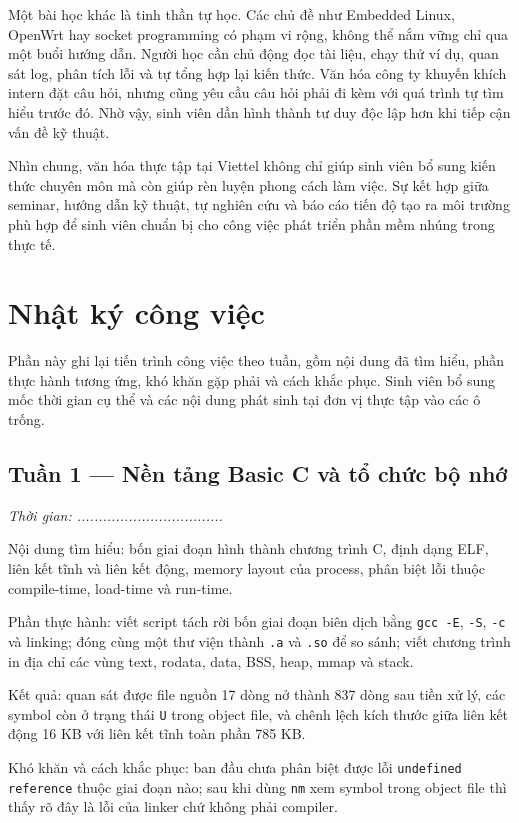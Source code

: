 \documentclass[11pt]{article}
\newcommand{\code}[1]{\texttt{#1}}
\begin{document}
Một bài học khác là tinh thần tự học. Các chủ đề như Embedded Linux, OpenWrt hay socket programming có phạm vi rộng, không thể nắm vững chỉ qua một buổi hướng dẫn. Người học cần chủ động đọc tài liệu, chạy thử ví dụ, quan sát log, phân tích lỗi và tự tổng hợp lại kiến thức. Văn hóa công ty khuyến khích intern đặt câu hỏi, nhưng cũng yêu cầu câu hỏi phải đi kèm với quá trình tự tìm hiểu trước đó. Nhờ vậy, sinh viên dần hình thành tư duy độc lập hơn khi tiếp cận vấn đề kỹ thuật.

Nhìn chung, văn hóa thực tập tại Viettel không chỉ giúp sinh viên bổ sung kiến thức chuyên môn mà còn giúp rèn luyện phong cách làm việc. Sự kết hợp giữa seminar, hướng dẫn kỹ thuật, tự nghiên cứu và báo cáo tiến độ tạo ra môi trường phù hợp để sinh viên chuẩn bị cho công việc phát triển phần mềm nhúng trong thực tế.

\section{Nhật ký công việc}

Phần này ghi lại tiến trình công việc theo tuần, gồm nội dung đã tìm hiểu, phần thực hành tương ứng, khó khăn gặp phải và cách khắc phục. Sinh viên bổ sung mốc thời gian cụ thể và các nội dung phát sinh tại đơn vị thực tập vào các ô trống.

\subsection*{Tuần 1 --- Nền tảng Basic C và tổ chức bộ nhớ}

\textit{Thời gian: ..................................}

Nội dung tìm hiểu: bốn giai đoạn hình thành chương trình C, định dạng ELF, liên kết tĩnh và liên kết động, memory layout của process, phân biệt lỗi thuộc compile-time, load-time và run-time.

Phần thực hành: viết script tách rời bốn giai đoạn biên dịch bằng \code{gcc -E}, \code{-S}, \code{-c} và linking; đóng cùng một thư viện thành \code{.a} và \code{.so} để so sánh; viết chương trình in địa chỉ các vùng text, rodata, data, BSS, heap, mmap và stack.

Kết quả: quan sát được file nguồn 17 dòng nở thành 837 dòng sau tiền xử lý, các symbol còn ở trạng thái \code{U} trong object file, và chênh lệch kích thước giữa liên kết động 16 KB với liên kết tĩnh toàn phần 785 KB.

Khó khăn và cách khắc phục: ban đầu chưa phân biệt được lỗi \code{undefined reference} thuộc giai đoạn nào; sau khi dùng \code{nm} xem symbol trong object file thì thấy rõ đây là lỗi của linker chứ không phải compiler.
\end{document}
